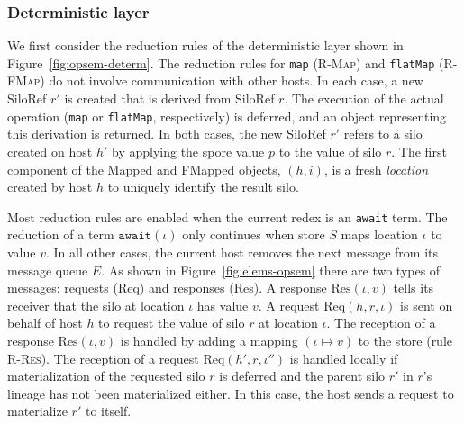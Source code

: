 \documentclass[preprint]{sigplanconf}
\theoremstyle{definition}
\theoremstyle{definition}
\begin{document}
\subsubsection{Deterministic layer}\label{sec:det-layer}

We first consider the reduction rules of the deterministic layer shown in Figure~\ref{fig:opsem-determ}. The reduction rules for \texttt{map} (\textsc{R-Map}) and \texttt{flatMap} (\textsc{R-FMap}) do not involve communication with other hosts. In each case, a new SiloRef $r'$ is created that is derived from SiloRef $r$. The execution of the actual operation (\texttt{map} or \texttt{flatMap}, respectively) is deferred, and an object representing this derivation is returned. In both cases, the new SiloRef $r'$ refers to a silo created on host $h'$ by applying the spore value $p$ to the value of silo $r$. The first component of the Mapped and FMapped objects, $(h, i)$, is a fresh \emph{location} created by host $h$ to uniquely identify the result silo.

Most reduction rules are enabled when the current redex is an \texttt{await} term. The reduction of a term $\texttt{await}(\iota)$ only continues when store $S$ maps location $\iota$ to value $v$. In all other cases, the current host removes the next message from its message queue $E$. As shown in Figure~\ref{fig:elems-opsem} there are two types of messages: requests (Req) and responses (Res). A response $\text{Res}(\iota, v)$ tells its receiver that the silo at location $\iota$ has value $v$. A request $\text{Req}(h, r, \iota)$ is sent on behalf of host $h$ to request the value of silo $r$ at location $\iota$. The reception of a response $\text{Res}(\iota, v)$ is handled by adding a mapping $(\iota \mapsto v)$ to the store (rule \textsc{R-Res}). The reception of a request $\text{Req}(h', r, \iota'')$ is handled locally if materialization of the requested silo $r$ is deferred and the parent silo $r'$ in $r$'s lineage has not been materialized either. In this case, the host sends a request to materialize $r'$ to itself.
\end{document}
